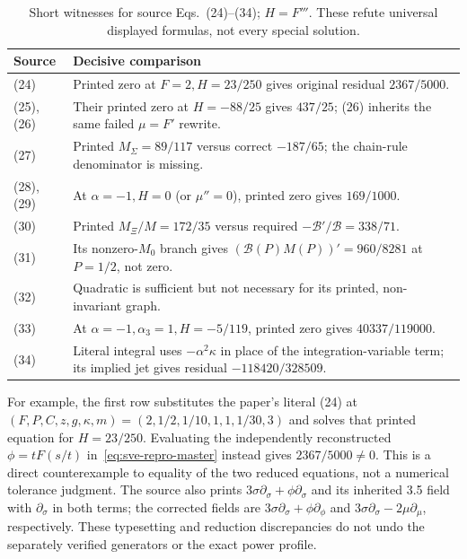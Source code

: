 \begin{table}[ht]
\centering\small
\begin{tabularx}{\linewidth}{@{}p{1.35cm}X@{}}
\toprule
Source & Decisive comparison\\
\midrule
(24) & Printed zero at $F=2,H=23/250$ gives original residual $2367/5000$.\\
(25), (26) & Their printed zero at $H=-88/25$ gives $437/25$; (26) inherits the same failed $\mu=F'$ rewrite.\\
(27) & Printed $M_\Sigma=89/117$ versus correct $-187/65$; the chain-rule denominator is missing.\\
(28), (29) & At $\alpha=-1,H=0$ (or $\mu''=0$), printed zero gives $169/1000$.\\
(30) & Printed $M_\Xi/M=172/35$ versus required $-\mathcal B'/\mathcal B=338/71$.\\
(31) & Its nonzero-$M_0$ branch gives $(\mathcal B(P)M(P))'=960/8281$ at $P=1/2$, not zero.\\
(32) & Quadratic is sufficient but not necessary for its printed, non-invariant graph.\\
(33) & At $\alpha=-1,\alpha_3=1,H=-5/119$, printed zero gives $40337/119000$.\\
(34) & Literal integral uses $-\alpha^2\kappa$ in place of the integration-variable term; its implied jet gives residual $-118420/328509$.\\
\bottomrule
\end{tabularx}
\caption{Short witnesses for source Eqs.~(24)--(34); $H=F'''$. These refute universal displayed formulas, not every special solution.}
\label{tab:sve-repro-source-errors}
\end{table}

For example, the first row substitutes the paper's literal (24) at
$(F,P,C,z,g,\kappa,m)=(2,1/2,1/10,1,1,1/30,3)$ and solves that
printed equation for $H=23/250$. Evaluating the independently reconstructed
$\phi=tF(s/t)$ in~\eqref{eq:sve-repro-master} instead gives
$2367/5000\ne0$. This is a direct counterexample to equality of the two
reduced equations, not a numerical tolerance judgment. The source also
prints $3\sigma\partial_\sigma+\phi\partial_\sigma$ and its inherited
3.5 field with $\partial_\sigma$ in both terms; the corrected fields are
$3\sigma\partial_\sigma+\phi\partial_\phi$ and
$3\sigma\partial_\sigma-2\mu\partial_\mu$, respectively.
These typesetting and reduction discrepancies do not undo the separately
verified generators or the exact power profile.


